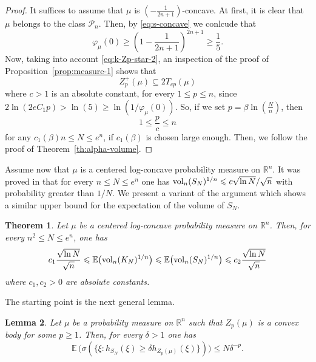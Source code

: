 \documentclass[11pt,leqno]{article}
\newtheorem{theorem}{Theorem}[section]
\newtheorem{lemma}[theorem]{Lemma}
\theoremstyle{definition}
\theoremstyle{remark}
\numberwithin{equation}{section}
\newcommand{\vol}{{\rm vol}}
\newcommand{\ls}{\leqslant}
\newcommand{\gr}{\geqslant}
\newcommand{\1}{\textbf{1}}
\begin{document}
\begin{proof}
It suffices to assume that $\mu$ is $(-\frac{1}{2n+1})$-concave. At first, it is clear that $\mu$ belongs to the class $\mathcal{P}_n$. Then, by \eqref{eq:s-concave} we conlcude that
$$\varphi_\mu(0) \gr \left(1-\frac{1}{2n+1}\right)^{2n+1} \gr \frac{1}{5}.$$
Now, taking into account \eqref{eq:k-Zp-star-2}, an inspection of the proof of Proposition~\ref{prop:measure-1} shows that
$$Z_{p}^+(\mu) \subseteq 2T_{cp}(\mu)$$
where $c>1$ is an absolute constant, for every $1 \ls p \ls n$, since $2\ln(2eC_1p) > \ln(5) \gr \ln(1/\varphi_\mu (0))$.
So, if we set $p=\beta\ln(\frac{N}{n})$, then
$$1 \ls \frac{p}{c} \ls n$$
for any $c_1(\beta)n\ls N \ls e^n$, if $c_1(\beta)$ is chosen large enough. Then, we follow the proof of Theorem~\ref{th:alpha-volume}.
\end{proof}

Assume now that $\mu$ is a centered log-concave probability measure on $\mathbb{R}^n$. It was proved in \cite{DGT1}
that for every $n\ls N\ls e^n$ one has $\vol_n(S_N)^{1/n}\ls c\sqrt{\ln N}/\sqrt{n}$ with probability
greater than $1/N$. We present a variant of the argument which shows a similar upper bound for the
expectation of the volume of $S_N$.

\begin{theorem}\label{th:new-volume}Let $\mu $ be a centered log-concave probability measure
on $\mathbb{R}^n$. Then, for every $n^2\ls N\ls e^n$, one has
\begin{equation}\label{eq:main-new-volume}
c_1\frac{\sqrt{\ln N}}{\sqrt{n}}\ls \mathbb{E}\big(\vol_n(K_N)^{1/n}\big)\ls \mathbb{E}\big(\vol_n(S_N)^{1/n}\big)
\ls c_2\frac{\sqrt{\ln N}}{\sqrt{n}}\end{equation}
where $c_1,c_2>0$ are absolute constants.
\end{theorem}

The starting point is the next general lemma.

\begin{lemma}\label{lem:comp}Let $\mu $ be a probability measure on ${\mathbb R}^n$
such that $Z_p(\mu)$ is a convex body for some $p\gr 1$. Then, for every $\delta>1$ one has
\begin{equation*}{\mathbb E}\,\Big(\sigma (\{\xi : h_{S_N}(\xi )\gr \delta h_{Z_p(\mu )}(\xi
)\})\Big) \ls N\delta^{-p}. \end{equation*}
\end{lemma}
\end{document}
